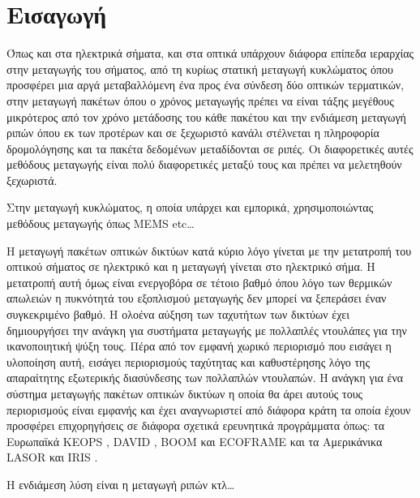 \section{Εισαγωγή}

Όπως και στα ηλεκτρικά σήματα, και στα οπτικά υπάρχουν διάφορα επίπεδα
ιεραρχίας στην μεταγωγής του σήματος, από τη κυρίως στατική μεταγωγή
κυκλώματος όπου προσφέρει μια αργά μεταβαλλόμενη ένα προς ένα σύνδεση
δύο οπτικών τερματικών, στην μεταγωγή πακέτων όπου ο χρόνος
μεταγωγής πρέπει να είναι τάξης μεγέθους μικρότερος από τον χρόνο
μετάδοσης του κάθε πακέτου και την ενδιάμεση μεταγωγή ριπών όπου εκ
των προτέρων και σε ξεχωριστό κανάλι στέλνεται η πληροφορία
δρομολόγησης και τα πακέτα δεδομένων μεταδίδονται σε ριπές. Οι
διαφορετικές αυτές μεθόδους μεταγωγής είναι πολύ διαφορετικές μεταξύ
τους και πρέπει να μελετηθούν ξεχωριστά.

Στην μεταγωγή κυκλώματος, η οποία υπάρχει και εμπορικά,
χρησιμοποιώντας μεθόδους μεταγωγής όπως MEMS etc\ldots

Η μεταγωγή πακέτων οπτικών δικτύων κατά κύριο λόγο γίνεται με την
μετατροπή του οπτικού σήματος σε ηλεκτρικό και η μεταγωγή γίνεται στο
ηλεκτρικό σήμα. Η μετατροπή αυτή όμως είναι ενεργοβόρα σε τέτοιο βαθμό
όπου λόγο των θερμικών απωλειών η πυκνότητά του εξοπλισμού μεταγωγής
δεν μπορεί να ξεπεράσει έναν συγκεκριμένο βαθμό. Η ολοένα αύξηση των
ταχυτήτων των δικτύων έχει δημιουργήσει την ανάγκη για συστήματα
μεταγωγής με πολλαπλές ντουλάπες για την ικανοποιητική ψύξη τους. Πέρα
από τον εμφανή χωρικό περιορισμό που εισάγει η υλοποίηση αυτή, εισάγει
περιορισμούς ταχύτητας και καθυστέρησης λόγο της απαραίτητης
εξωτερικής διασύνδεσης των πολλαπλών ντουλαπών. Η ανάγκη για ένα
σύστημα μεταγωγής πακέτων οπτικών δικτύων η οποία θα άρει αυτούς τους
περιορισμούς είναι εμφανής και έχει αναγνωριστεί από διάφορα κράτη τα
οποία έχουν προσφέρει επιχορηγήσεις σε διάφορα σχετικά ερευνητικά
προγράμματα όπως: τα Ευρωπαϊκά KEOPS \cite{736580}, DAVID
\cite{1230193}, BOOM \cite{5398841} και ECOFRAME \cite{5465485} και τα
Αμερικάνικα LASOR \cite{4804163} και IRIS \cite{IRIS}.

Η ενδιάμεση λύση είναι η μεταγωγή ριπών κτλ\ldots

